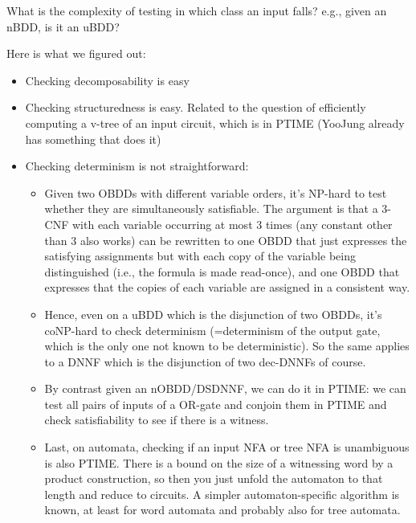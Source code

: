 What is the complexity of testing in which class an input falls? e.g., given an nBDD, is it an uBDD?

Here is what we figured out:

\begin{itemize}
\item Checking decomposability is easy
\item Checking structuredness is easy. Related to the question of efficiently computing a v-tree of an input circuit, which is in PTIME (YooJung already has something that does it)
\item Checking determinism is not straightforward:
    \begin{itemize}
        \item Given two OBDDs with different variable orders, it's NP-hard to test whether they are simultaneously satisfiable. The argument is that a 3-CNF with each variable occurring at most 3 times (any constant other than 3 also works) can be rewritten to one OBDD that just expresses the satisfying assignments but with each copy of the variable being distinguished (i.e., the formula is made read-once), and one OBDD that expresses that the copies of each variable are assigned in a consistent way.
        \item Hence, even on a uBDD which is the disjunction of two OBDDs, it's coNP-hard to check determinism (=determinism of the output gate, which is the only one not known to be deterministic). So the same applies to a DNNF which is the disjunction of two dec-DNNFs of course.
        \item By contrast given an nOBDD/DSDNNF, we can do it in PTIME: we can test all pairs of inputs of a OR-gate and conjoin them in PTIME and check satisfiability to see if there is a witness.
        \item Last, on automata, checking if an input NFA or tree NFA is unambiguous is also PTIME. There is a bound on the size of a witnessing word by a product construction, so then you just unfold the automaton to that length and reduce to circuits. A simpler automaton-specific algorithm is known, at least for word automata and probably also for tree automata.
    \end{itemize}
\end{itemize}